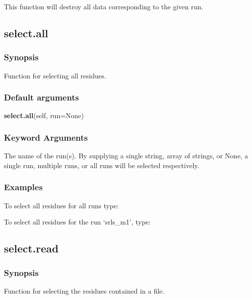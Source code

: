 This function will destroy all data corresponding to the given run.


\newpage

\subsection{select.all}


\subsubsection{Synopsis}

Function for selecting all residues.

\subsubsection{Default arguments}

\textsf{\textbf{select.all}(self, run=None)}


\subsubsection{Keyword Arguments}

  The name of the run(s).  By supplying a single string, array of strings, or None, a single run, multiple runs, or all runs will be selected respectively.

\subsubsection{Examples}

To select all residues for all runs type:


To select all residues for the run `srls\_m1', type:




\newpage

\subsection{select.read}


\subsubsection{Synopsis}

Function for selecting the residues contained in a file.

